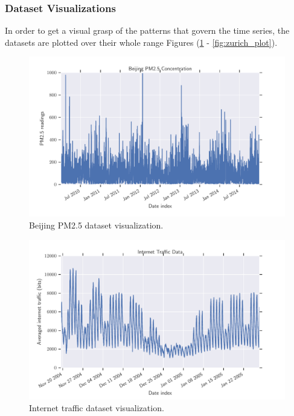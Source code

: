 \documentclass[a4paper, 12pt]{article}
\numberwithin{equation}{section}
\numberwithin{figure}{section}
\numberwithin{table}{section}
\begin{document}
	\newpage
	
	\subsubsection{Dataset Visualizations}
	
	In order to get a visual grasp of the patterns that govern the time series, the datasets are plotted over their whole range \textemdash Figures (\ref{fig:beijing_plot} - \ref{fig:zurich_plot}).
	
	\begin{figure}[H]
		\centering
		\includegraphics[width=\textwidth, height=\textheight, keepaspectratio]{datasets/beijing.pdf}
		\caption{Beijing PM2.5 dataset visualization.}
		\label{fig:beijing_plot}
	\end{figure}
	
	\begin{figure}[H]
		\centering
		\includegraphics[width=\textwidth, height=\textheight, keepaspectratio]{datasets/internet.pdf}
		\caption{Internet traffic dataset visualization.}
		\label{fig:internet_plot}
	\end{figure}
\end{document}
